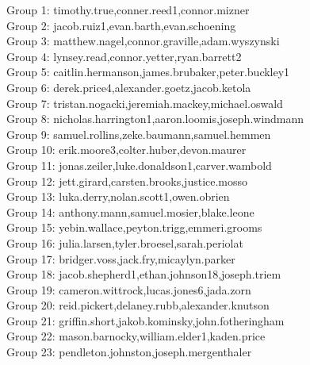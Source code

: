 \documentclass[10pt]{beamer}
\begin{document}
\begin{frame}
\footnotesize
Group 1: timothy.true,conner.reed1,connor.mizner\\
Group 2: jacob.ruiz1,evan.barth,evan.schoening\\
Group 3: matthew.nagel,connor.graville,adam.wyszynski\\
Group 4: lynsey.read,connor.yetter,ryan.barrett2\\
Group 5: caitlin.hermanson,james.brubaker,peter.buckley1\\
Group 6: derek.price4,alexander.goetz,jacob.ketola\\
Group 7: tristan.nogacki,jeremiah.mackey,michael.oswald\\
Group 8: nicholas.harrington1,aaron.loomis,joseph.windmann\\
Group 9: samuel.rollins,zeke.baumann,samuel.hemmen\\
Group 10: erik.moore3,colter.huber,devon.maurer\\
Group 11: jonas.zeiler,luke.donaldson1,carver.wambold\\
Group 12: jett.girard,carsten.brooks,justice.mosso\\
Group 13: luka.derry,nolan.scott1,owen.obrien\\
Group 14: anthony.mann,samuel.mosier,blake.leone\\
Group 15: yebin.wallace,peyton.trigg,emmeri.grooms\\
Group 16: julia.larsen,tyler.broesel,sarah.periolat\\
Group 17: bridger.voss,jack.fry,micaylyn.parker\\
Group 18: jacob.shepherd1,ethan.johnson18,joseph.triem\\
Group 19: cameron.wittrock,lucas.jones6,jada.zorn\\
Group 20: reid.pickert,delaney.rubb,alexander.knutson\\
Group 21: griffin.short,jakob.kominsky,john.fotheringham\\
Group 22: mason.barnocky,william.elder1,kaden.price\\
Group 23: pendleton.johnston,joseph.mergenthaler
\end{frame}
\end{document}
